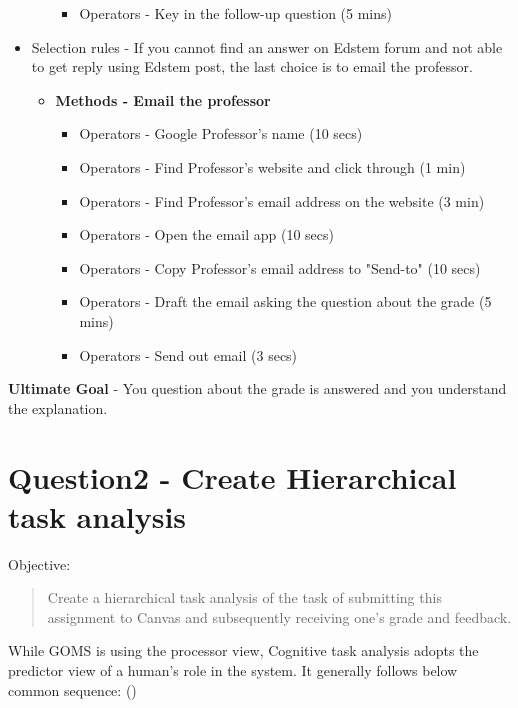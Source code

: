 \documentclass[
	letterpaper, %
]{jdf}
\begin{document}
\begin{itemize}
\begin{itemize}
\begin{itemize}
                    \item Operators - Key in the follow-up question (5 mins)
                \end{itemize}
        \end{itemize}
    \item Selection rules - If you cannot find an answer on Edstem forum and not able to get reply using Edstem post, the last choice is to email the professor.
        \begin{itemize}
            \item \textbf{Methods - Email the professor}
                \begin{itemize}
                    \item Operators - Google Professor's name (10 secs)
                    \item Operators - Find Professor's website and click through (1 min)
                    \item Operators - Find Professor's email address on the website (3 min)
                    \item Operators - Open the email app (10 secs)
                    \item Operators - Copy Professor's email address to "Send-to" (10 secs)
                    \item Operators - Draft the email asking the question about the grade (5 mins)
                    \item Operators - Send out email (3 secs)
                \end{itemize}
        \end{itemize}
\end{itemize}
\textbf{Ultimate Goal} - You question about the grade is answered and you understand the explanation.

\section{Question2 - Create Hierarchical task analysis}
Objective: 
\begin{quote}
    Create a hierarchical task analysis of the task of submitting this assignment to Canvas and subsequently receiving one’s grade and feedback.
\end{quote}

While GOMS is using the processor view, Cognitive task analysis adopts the predictor view of a human's role in the system. It generally follows below common sequence: (\cite{joyner2016b})
\end{document}
